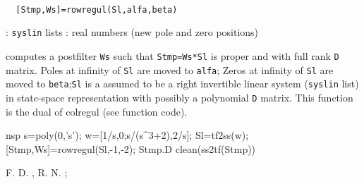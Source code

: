 \begin{mandesc}
   \\ %
\end{mandesc}
\begin{calling_sequence}
\begin{verbatim}
  [Stmp,Ws]=rowregul(Sl,alfa,beta)   
\end{verbatim}
\end{calling_sequence}
\begin{parameters}
  \begin{varlist}
    : \verb!syslin! lists
    : real numbers (new pole and zero positions)
  \end{varlist}
\end{parameters}
\begin{mandescription}
  computes a postfilter \verb!Ws! such that \verb!Stmp=Ws*Sl! is proper and with
  full rank \verb!D! matrix.  Poles at infinity of \verb!Sl! are moved to
  \verb!alfa!; Zeros at infinity of \verb!Sl! are moved to \verb!beta!;\verb!Sl!
  is a assumed to be a right invertible linear system (\verb!syslin! list) in
  state-space representation with possibly a polynomial \verb!D! matrix.  This
  function is the dual of colregul (see function code).
\end{mandescription}
\begin{examples}
  \begin{mintednsp}{nsp}
    s=poly(0,'s');
    w=[1/s,0;s/(s^3+2),2/s];
    Sl=tf2ss(w);
    [Stmp,Ws]=rowregul(Sl,-1,-2);
    Stmp.D
    clean(ss2tf(Stmp))
  \end{mintednsp}
\end{examples}
\begin{manseealso}
     
\end{manseealso}
\begin{authors}
  F. D. , R. N. ;   
\end{authors}
